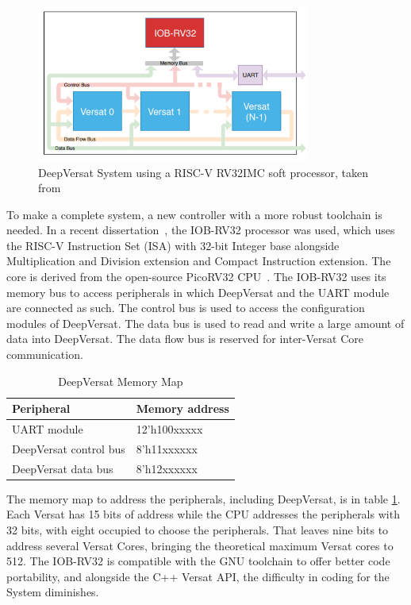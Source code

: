 \begin{figure}[!htbp]
    \centering
    \includegraphics[width=0.8\textwidth]{Figures/deep-Versat-top.png}
    \caption{DeepVersat System using a RISC-V RV32IMC soft processor, taken from~\cite{valter:deepversat}}
    \label{figure:deepversattop}
\end{figure} 

\quad To make a complete system, a new controller with a more robust toolchain is needed.
In a recent dissertation~\cite{valter:deepversat}, the IOB-RV32 processor was used, which uses the RISC-V Instruction Set (ISA) with 32-bit Integer base alongside Multiplication and Division extension and Compact Instruction extension.
 The core is derived from
the open-source PicoRV32 CPU~\cite{picorv}.
The IOB-RV32 uses its memory bus to access peripherals in which DeepVersat and the UART module are connected as such.
The control bus is used to access the configuration modules of DeepVersat. The data bus is used to read and write
a large amount of data into DeepVersat. The data flow bus is reserved for inter-Versat Core communication.

\begin{table}[!htbp]
    \centering
    \begin{tabular}{|ll|}
        \hline
        \textbf{Peripheral}     & \textbf{Memory address} \\ \hline
        UART module             & 12’h100xxxxx            \\ \hline
        DeepVersat control bus & 8’h11xxxxxx             \\ \hline
        DeepVersat data bus    & 8’h12xxxxxx             \\ \hline
        \end{tabular}
    \caption{DeepVersat Memory Map}
    \label{table:deepversat}
    \end{table}


The memory map to address the peripherals,
 including DeepVersat, is in table \ref{table:deepversat}.
 Each Versat has 15 bits of address while the CPU addresses
 the peripherals with 32 bits, with eight occupied to choose
 the peripherals. That leaves nine bits to address several Versat Cores, bringing the theoretical maximum Versat cores to 512. The IOB-RV32 is compatible with the
 GNU toolchain to offer better code portability, and alongside the C++ Versat API, the difficulty
 in coding for the System diminishes.
